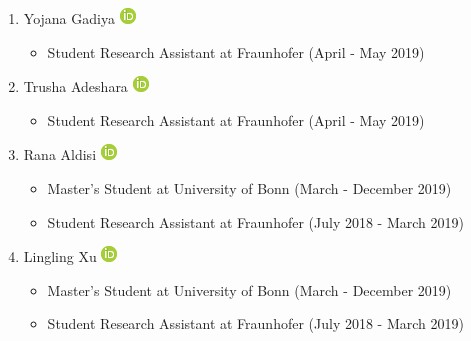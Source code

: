 \documentclass[10pt,a4paper,sans]{moderncv} %
\begin{document}
\begin{enumerate}
        \item     Yojana Gadiya {\scriptsize     \href{https://orcid.org/0000-0002-7683-0452}{\includegraphics[scale=0.5]{img/ORCIDiD_icon16x16}}
}    \begin{itemize}
        \item {\scriptsize Student Research Assistant at Fraunhofer (April - May 2019)}
    \end{itemize}

        \item     Trusha Adeshara {\scriptsize     \href{https://orcid.org/0000-0002-8929-4724}{\includegraphics[scale=0.5]{img/ORCIDiD_icon16x16}}
}    \begin{itemize}
        \item {\scriptsize Student Research Assistant at Fraunhofer (April - May 2019)}
    \end{itemize}

        \item     Rana Aldisi {\scriptsize     \href{https://orcid.org/0000-0002-3034-9970}{\includegraphics[scale=0.5]{img/ORCIDiD_icon16x16}}
}    \begin{itemize}
        \item {\scriptsize Master's Student at University of Bonn (March - December 2019)}
        \item {\scriptsize Student Research Assistant at Fraunhofer (July 2018 - March 2019)}
    \end{itemize}

        \item     Lingling Xu {\scriptsize     \href{https://orcid.org/0000-0002-0303-8616}{\includegraphics[scale=0.5]{img/ORCIDiD_icon16x16}}
}    \begin{itemize}
        \item {\scriptsize Master's Student at University of Bonn (March - December 2019)}
        \item {\scriptsize Student Research Assistant at Fraunhofer (July 2018 - March 2019)}
    \end{itemize}


\end{enumerate}
\end{document}
